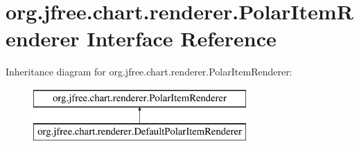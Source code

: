 \hypertarget{interfaceorg_1_1jfree_1_1chart_1_1renderer_1_1_polar_item_renderer}{}\section{org.\+jfree.\+chart.\+renderer.\+Polar\+Item\+Renderer Interface Reference}
\label{interfaceorg_1_1jfree_1_1chart_1_1renderer_1_1_polar_item_renderer}
Inheritance diagram for org.\+jfree.\+chart.\+renderer.\+Polar\+Item\+Renderer\+:\begin{figure}[H]
\begin{center}
\leavevmode
\includegraphics[height=2.000000cm]{interfaceorg_1_1jfree_1_1chart_1_1renderer_1_1_polar_item_renderer}
\end{center}
\end{figure}
